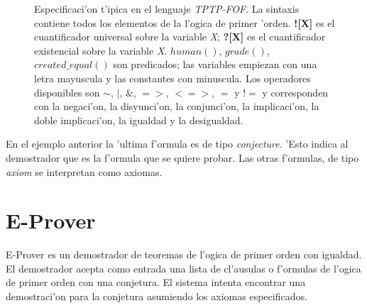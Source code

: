 
\begin{figure}[htbp]
\caption{Especificaci'on t'ipica en el lenguaje \textit{TPTP-FOF}. La sintaxis contiene todos los elementos de la l'ogica de primer 'orden. \textbf{![X]} es el cuantificador universal sobre la variable \textit{X}; \textbf{?[X]} es el cuantificador existencial sobre la variable \textit{X}. \textit{$human()$}, \textit{$grade()$}, \textit{$created\_equal()$} son predicados; las variables empiezan con una letra mayuscula y las constantes con minuscula. Los operadores disponibles son $\sim$, $|$, $\&$, $=>$, $<=>$, $=$ y $!=$ y corresponden con la negaci'on, la disyunci'on, la conjunci'on, la implicaci'on, la doble implicaci'on, la igualdad y la desigualdad.}
\end{figure}

En el ejemplo anterior la 'ultima f'ormula es de tipo \textit{conjecture}. 'Esto indica al demostrador que es la f'ormula que se quiere probar. Las otras f'ormulas, de tipo \textit{axiom} se interpretan como axiomas.

\section{E-Prover}

E-Prover es un demostrador de teoremas de l'ogica de primer orden con igualdad. El demostrador acepta como entrada una lista de cl'ausulas o f'ormulas de l'ogica de primer orden con una conjetura. El sistema intenta encontrar una demostraci'on para la conjetura asumiendo los axiomas especificados.

